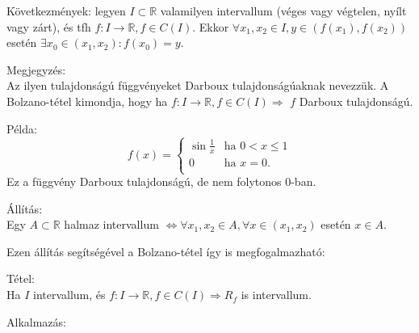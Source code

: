 \documentclass[12pt,a4paper]{scrartcl}
\newenvironment{tetel}{}{}
\newenvironment{allitas}{}{}
\newenvironment{megjegyzes}{}{}
\newenvironment{pelda}{}{}
\begin{document}
Következmények: legyen \(I \subset {\mathbb{R}}\) valamilyen intervallum
(véges vagy végtelen, nyílt vagy zárt), és tfh
\(\left. f:I\rightarrow{\mathbb{R}},f \in C\left( I \right) \right.\).
Ekkor
\(\forall x_{1},x_{2} \in I,y \in \left( {f\left( x_{1} \right),f\left( x_{2} \right)} \right)\)
esetén
\(\exists x_{0} \in \left( {x_{1},x_{2}} \right):f\left( x_{0} \right) = y\).

\begin{megjegyzes}

Megjegyzés:\\
Az ilyen tulajdonságú függvényeket Darboux tulajdonságúaknak nevezzük. A
Bolzano-tétel kimondja, hogy ha
\(\left. f:I\rightarrow{\mathbb{R}},f \in C\left( I \right)\Rightarrow \right.\)
\(f\) Darboux tulajdonságú.

\end{megjegyzes}

\begin{pelda}

Példa: \[f\left( x \right) = \begin{cases}
{\sin\frac{1}{x}} & {\text{ha~}0 < x \leq 1} \\
0 & {\text{ha~}x = 0.} \\
\end{cases}\] Ez a függvény Darboux tulajdonságú, de nem folytonos
0-ban.

\end{pelda}

\begin{allitas}

Állítás:\\
Egy \(A \subset {\mathbb{R}}\) halmaz intervallum
\(\left. \Leftrightarrow\forall x_{1},x_{2} \in A,\forall x \in \left( {x_{1},x_{2}} \right) \right.\)
esetén \(x \in A\).

\end{allitas}

Ezen állítás segítségével a Bolzano-tétel így is megfogalmazható:

\begin{tetel}

Tétel:\\
Ha \(I\) intervallum, és
\(\left. f:I\rightarrow{\mathbb{R}},f \in C\left( I \right)\Rightarrow R_{f} \right.\)
is intervallum.

\end{tetel}

Alkalmazás:
\end{document}
